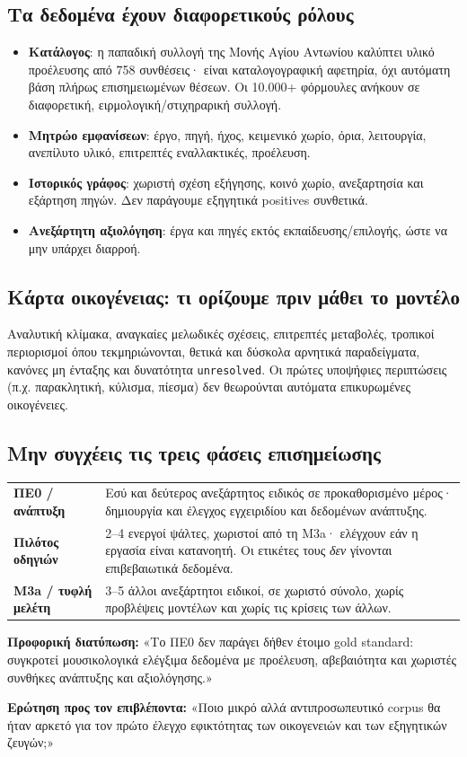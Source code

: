 \documentclass[9pt,a4paper]{extarticle}
\newcommand{\say}[1]{\begin{keybox}\textbf{Προφορική διατύπωση:} #1\end{keybox}}
\newcommand{\ask}[1]{\begin{warnbox}\textbf{Ερώτηση προς τον επιβλέποντα:} #1\end{warnbox}}
\begin{document}
\subsection*{Τα δεδομένα έχουν διαφορετικούς ρόλους}
\begin{itemize}
\item \textbf{Κατάλογος}: η παπαδική συλλογή της Μονής Αγίου Αντωνίου καλύπτει υλικό προέλευσης από 758 συνθέσεις· είναι καταλογογραφική αφετηρία, όχι αυτόματη βάση πλήρως επισημειωμένων θέσεων. Οι 10.000+ φόρμουλες ανήκουν σε διαφορετική, ειρμολογική/στιχηραρική συλλογή.
\item \textbf{Μητρώο εμφανίσεων}: έργο, πηγή, ήχος, κειμενικό χωρίο, όρια, λειτουργία, ανεπίλυτο υλικό, επιτρεπτές εναλλακτικές, προέλευση.
\item \textbf{Ιστορικός γράφος}: χωριστή σχέση εξήγησης, κοινό χωρίο, ανεξαρτησία και εξάρτηση πηγών. Δεν παράγουμε εξηγητικά positives συνθετικά.
\item \textbf{Ανεξάρτητη αξιολόγηση}: έργα και πηγές εκτός εκπαίδευσης/επιλογής, ώστε να μην υπάρχει διαρροή.
\end{itemize}
\subsection*{Κάρτα οικογένειας: τι ορίζουμε πριν μάθει το μοντέλο}
Αναλυτική κλίμακα, αναγκαίες μελωδικές σχέσεις, επιτρεπτές μεταβολές, τροπικοί περιορισμοί όπου τεκμηριώνονται, θετικά και δύσκολα αρνητικά παραδείγματα, κανόνες μη ένταξης και δυνατότητα \texttt{unresolved}. Οι πρώτες υποψήφιες περιπτώσεις (π.χ. παρακλητική, κύλισμα, πίεσμα) δεν θεωρούνται αυτόματα επικυρωμένες οικογένειες.
\subsection*{Μην συγχέεις τις τρεις φάσεις επισημείωσης}
\begin{tabularx}{\linewidth}{>{\bfseries}p{3cm}X}
ΠΕ0 / ανάπτυξη & Εσύ και δεύτερος ανεξάρτητος ειδικός σε προκαθορισμένο μέρος· δημιουργία και έλεγχος εγχειριδίου και δεδομένων ανάπτυξης.\tabularnewline
Πιλότος οδηγιών & 2--4 ενεργοί ψάλτες, χωριστοί από τη M3a· ελέγχουν εάν η εργασία είναι κατανοητή. Οι ετικέτες τους \emph{δεν} γίνονται επιβεβαιωτικά δεδομένα.\tabularnewline
M3a / τυφλή μελέτη & 3--5 άλλοι ανεξάρτητοι ειδικοί, σε χωριστό σύνολο, χωρίς προβλέψεις μοντέλων και χωρίς τις κρίσεις των άλλων.\tabularnewline
\end{tabularx}
\say{«Το ΠΕ0 δεν παράγει δήθεν έτοιμο gold standard: συγκροτεί μουσικολογικά ελέγξιμα δεδομένα με προέλευση, αβεβαιότητα και χωριστές συνθήκες ανάπτυξης και αξιολόγησης.»}
\ask{«Ποιο μικρό αλλά αντιπροσωπευτικό corpus θα ήταν αρκετό για τον πρώτο έλεγχο εφικτότητας των οικογενειών και των εξηγητικών ζευγών;»}
\newpage
\end{document}

